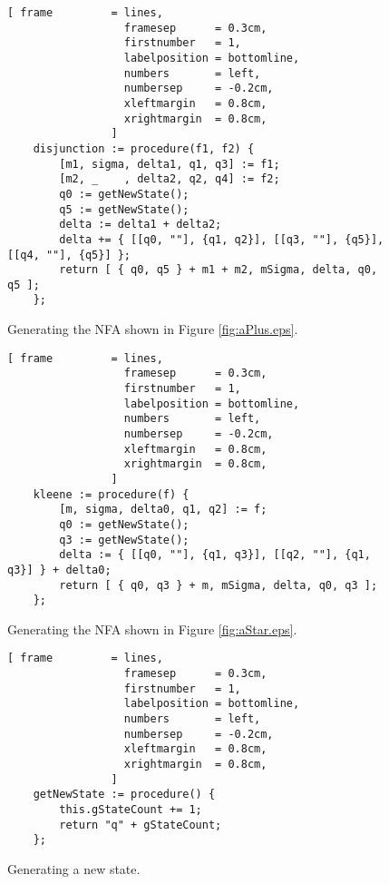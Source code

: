 \begin{enumerate}
\begin{figure}[!ht]
\centering
\begin{Verbatim}[ frame         = lines, 
                  framesep      = 0.3cm, 
                  firstnumber   = 1,
                  labelposition = bottomline,
                  numbers       = left,
                  numbersep     = -0.2cm,
                  xleftmargin   = 0.8cm,
                  xrightmargin  = 0.8cm,
                ]
    disjunction := procedure(f1, f2) {
        [m1, sigma, delta1, q1, q3] := f1;
        [m2, _    , delta2, q2, q4] := f2;
        q0 := getNewState(); 
        q5 := getNewState(); 
        delta := delta1 + delta2;
        delta += { [[q0, ""], {q1, q2}], [[q3, ""], {q5}], [[q4, ""], {q5}] };
        return [ { q0, q5 } + m1 + m2, mSigma, delta, q0, q5 ];
    };
\end{Verbatim}
\vspace*{-0.3cm}
\caption{Generating the NFA shown in Figure \ref{fig:aPlus.eps}.}
\label{fig:regexp-2-nfa.stlx:disjunction}
\end{figure}

\begin{figure}[!ht]
\centering
\begin{Verbatim}[ frame         = lines, 
                  framesep      = 0.3cm, 
                  firstnumber   = 1,
                  labelposition = bottomline,
                  numbers       = left,
                  numbersep     = -0.2cm,
                  xleftmargin   = 0.8cm,
                  xrightmargin  = 0.8cm,
                ]
    kleene := procedure(f) {
        [m, sigma, delta0, q1, q2] := f;
        q0 := getNewState(); 
        q3 := getNewState(); 
        delta := { [[q0, ""], {q1, q3}], [[q2, ""], {q1, q3}] } + delta0;
        return [ { q0, q3 } + m, mSigma, delta, q0, q3 ];
    };
\end{Verbatim}
\vspace*{-0.3cm}
\caption{Generating the NFA shown in Figure \ref{fig:aStar.eps}.}
\label{fig:regexp-2-nfa.stlx:kleene}
\end{figure}
\end{enumerate}


\begin{figure}[!ht]
\centering
\begin{Verbatim}[ frame         = lines, 
                  framesep      = 0.3cm, 
                  firstnumber   = 1,
                  labelposition = bottomline,
                  numbers       = left,
                  numbersep     = -0.2cm,
                  xleftmargin   = 0.8cm,
                  xrightmargin  = 0.8cm,
                ]
    getNewState := procedure() {
        this.gStateCount += 1;
        return "q" + gStateCount;
    };
\end{Verbatim}
\vspace*{-0.3cm}
\caption{Generating a new state.}
\label{fig:regexp-2-nfa.stlx:getNewState}
\end{figure}

